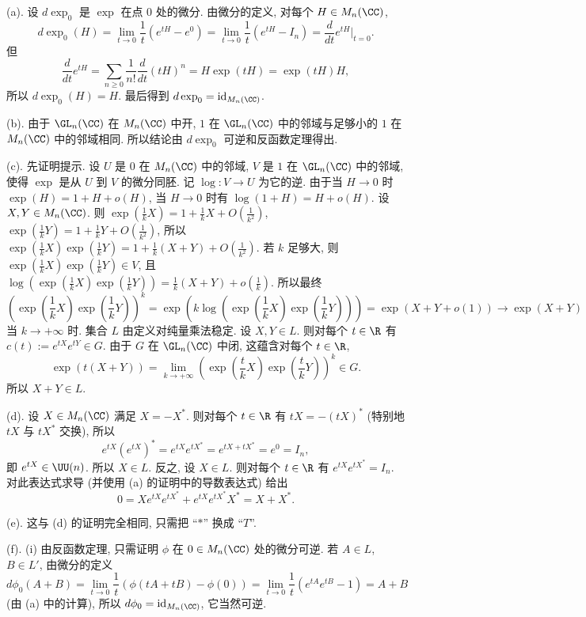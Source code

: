 \begin{solution}
(a). 设 $d\exp_0$ 是 $\exp$ 在点 $0$ 处的微分. 由微分的定义, 对每个 $H \in M_n(\CC)$,
\[
d\exp_0(H) = \lim_{t \to 0}\frac{1}{t}(e^{tH} - e^0) = \lim_{t \to 0}\frac{1}{t}(e^{tH} - I_n) = \frac{d}{dt}e^{tH}\Big|_{t=0}.
\]
但
\[
\frac{d}{dt}e^{tH} = \sum_{n \geq 0}\frac{1}{n!}\frac{d}{dt}(tH)^n = H\exp(tH) = \exp(tH)H,
\]
所以 $d\exp_0(H) = H$. 最后得到 $d\exp_0 = \mathrm{id}_{M_n(\CC)}$.

(b). 由于 $\GL_n(\CC)$ 在 $M_n(\CC)$ 中开, $1$ 在 $\GL_n(\CC)$ 中的邻域与足够小的 $1$ 在 $M_n(\CC)$ 中的邻域相同. 所以结论由 $d\exp_0$ 可逆和反函数定理得出.

(c). 先证明提示. 设 $U$ 是 $0$ 在 $M_n(\CC)$ 中的邻域, $V$ 是 $1$ 在 $\GL_n(\CC)$ 中的邻域, 使得 $\exp$ 是从 $U$ 到 $V$ 的微分同胚. 记 $\log \colon V \to U$ 为它的逆. 由于当 $H \to 0$ 时 $\exp(H) = 1 + H + o(H)$, 当 $H \to 0$ 时有 $\log(1 + H) = H + o(H)$.
设 $X, Y \in M_n(\CC)$. 则 $\exp(\frac{1}{k}X) = 1 + \frac{1}{k}X + O(\frac{1}{k^2})$, $\exp(\frac{1}{k}Y) = 1 + \frac{1}{k}Y + O(\frac{1}{k^2})$, 所以 $\exp(\frac{1}{k}X)\exp(\frac{1}{k}Y) = 1 + \frac{1}{k}(X + Y) + O(\frac{1}{k^2})$. 若 $k$ 足够大, 则 $\exp(\frac{1}{k}X)\exp(\frac{1}{k}Y) \in V$, 且 $\log(\exp(\frac{1}{k}X)\exp(\frac{1}{k}Y)) = \frac{1}{k}(X + Y) + o(\frac{1}{k})$. 所以最终
\[
(\exp(\frac{1}{k}X)\exp(\frac{1}{k}Y))^k = \exp(k\log(\exp(\frac{1}{k}X)\exp(\frac{1}{k}Y))) = \exp(X + Y + o(1)) \to \exp(X + Y)
\]
当 $k \to +\infty$ 时.
集合 $L$ 由定义对纯量乘法稳定. 设 $X, Y \in L$. 则对每个 $t \in \R$ 有 $c(t) := e^{tX}e^{tY} \in G$. 由于 $G$ 在 $\GL_n(\CC)$ 中闭, 这蕴含对每个 $t \in \R$,
\[
\exp(t(X + Y)) = \lim_{k \to +\infty}(\exp(\frac{t}{k}X)\exp(\frac{t}{k}Y))^k \in G.
\]
所以 $X + Y \in L$.

(d). 设 $X \in M_n(\CC)$ 满足 $X = -X^*$. 则对每个 $t \in \R$ 有 $tX = -(tX)^*$ (特别地 $tX$ 与 $tX^*$ 交换), 所以
\[
e^{tX}(e^{tX})^* = e^{tX}e^{tX^*} = e^{tX + tX^*} = e^0 = I_n,
\]
即 $e^{tX} \in \UU(n)$. 所以 $X \in L$.
反之, 设 $X \in L$. 则对每个 $t \in \R$ 有 $e^{tX}e^{tX^*} = I_n$. 对此表达式求导 (并使用 (a) 的证明中的导数表达式) 给出
\[
0 = Xe^{tX}e^{tX^*} + e^{tX}e^{tX^*}X^* = X + X^*.
\]

(e). 这与 (d) 的证明完全相同, 只需把 ``$*$'' 换成 ``$T$''.

(f). (i) 由反函数定理, 只需证明 $\phi$ 在 $0 \in M_n(\CC)$ 处的微分可逆. 若 $A \in L$, $B \in L'$, 由微分的定义
\[
d\phi_0(A + B) = \lim_{t \to 0}\frac{1}{t}(\phi(tA + tB) - \phi(0)) = \lim_{t \to 0}\frac{1}{t}(e^{tA}e^{tB} - 1) = A + B
\]
(由 (a) 中的计算), 所以 $d\phi_0 = \mathrm{id}_{M_n(\CC)}$, 它当然可逆.


\end{solution}
